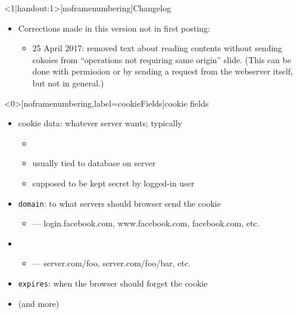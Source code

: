 \begin{frame}
    \titlepage
\end{frame}


{
\begin{frame}<1|handout:1>[noframenumbering]{Changelog}
    \begin{itemize}
        \item Corrections made in this version not in first posting:
        \begin{itemize}
            \item 25 April 2017: removed text about reading contents without sending cokoies
                from ``operations not requiring same origin'' slide. (This can be done with
                permission or by sending a request from the webserver itself, but not in general.)
        \end{itemize}
    \end{itemize}
\end{frame}
}


\begin{frame}<0>[noframenumbering,label=cookieFields]{cookie fields}
    \begin{itemize}
        \item cookie data: whatever server wants; typically 
        \begin{itemize}
            \item {}
            \item usually tied to database on server
            \item supposed to be kept secret by logged-in user
        \end{itemize}
    \item \texttt{domain}: to what servers should browser send the cookie
        \begin{itemize}
            \item {} --- login.facebook.com, www.facebook.com, facebook.com, etc.
        \end{itemize}
    \item {}
        \begin{itemize}
            \item {} --- server.com/foo, server.com/foo/bar, etc.
        \end{itemize}
    \item \texttt{expires}: when the browser should forget the cookie
    \item (and more)
    \end{itemize}
\end{frame}

